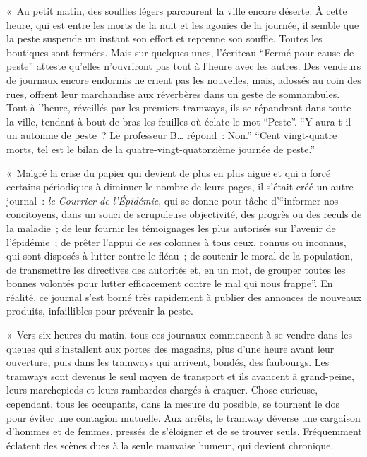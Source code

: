 \documentclass[french,twoside]{book} %
\begin{document}
« Au petit matin, des souffles légers parcourent la ville encore déserte. À cette heure, qui est entre les morts de la nuit et les agonies de la journée, il semble que la peste suspende un instant son effort et reprenne son souffle. Toutes les boutiques sont fermées. Mais sur quelques-unes, l’écriteau “Fermé pour cause de peste” atteste qu’elles n’ouvriront pas tout à l’heure avec les autres. Des vendeurs de journaux encore endormis ne crient pas les nouvelles, mais, adossés au coin des rues, offrent leur marchandise aux réverbères dans un geste de somnambules. Tout à l’heure, réveillés par les premiers tramways, ils se répandront dans toute la ville, tendant à bout de bras les feuilles où éclate le mot “Peste”. “Y aura-t-il un automne de peste ? Le professeur B… répond : Non.” “Cent vingt-quatre morts, tel est le bilan de la quatre-vingt-quatorzième journée de peste.”\par
« Malgré la crise du papier qui devient de plus en plus aiguë et qui a forcé certains périodiques à diminuer le nombre de leurs pages, il s’était créé un autre journal : \emph{le Courrier de l’Épidémie}, qui se donne pour tâche d’“informer nos concitoyens, dans un souci de scrupuleuse objectivité, des progrès ou des reculs de la maladie ; de leur fournir les témoignages les plus autorisés sur l’avenir de l’épidémie ; de prêter l’appui de ses colonnes à tous ceux, connus ou inconnus, qui sont disposés à lutter contre le fléau ; de soutenir le moral de la population, de transmettre les directives des autorités et, en un mot, de grouper toutes les bonnes volontés pour lutter efficacement contre le mal qui nous frappe”. En réalité, ce journal s’est borné très rapidement à publier des annonces de nouveaux produits, infaillibles pour prévenir la peste.\par
« Vers six heures du matin, tous ces journaux commencent à se vendre dans les queues qui s’installent aux portes des magasins, plus d’une heure avant leur ouverture, puis dans les tramways qui arrivent, bondés, des faubourgs. Les tramways sont devenus le seul moyen de transport et ils avancent à grand-peine, leurs marchepieds et leurs rambardes chargés à craquer. Chose curieuse, cependant, tous les occupants, dans la mesure du possible, se tournent le dos pour éviter une contagion mutuelle. Aux arrêts, le tramway déverse une cargaison d’hommes et de femmes, pressés de s’éloigner et de se trouver seuls. Fréquemment éclatent des scènes dues à la seule mauvaise humeur, qui devient chronique.\par
\end{document}
